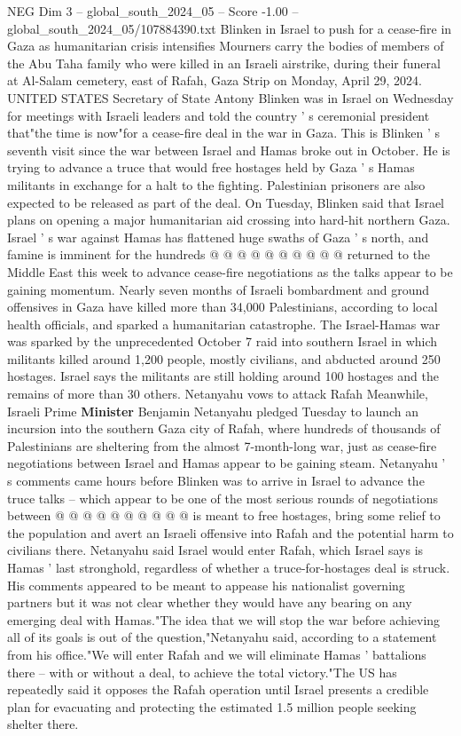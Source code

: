 \begin{textsample}{NEG Dim 3 – global\_south\_2024\_05 – Score -1.00 – global\_south\_2024\_05/107884390.txt}  \label{ex:f3_neg_364}
Blinken in Israel to push for a cease-fire in Gaza as humanitarian crisis intensifies Mourners carry the bodies of members of the Abu Taha family who were killed in an Israeli airstrike, during their funeral at Al-Salam cemetery, east of Rafah, Gaza Strip on Monday, April 29, 2024.
UNITED STATES Secretary of State Antony Blinken was in Israel on Wednesday for meetings with Israeli leaders and told the country ' s ceremonial president that"the time is now"for a cease-fire deal in the war in Gaza.
This is Blinken ' s seventh visit since the war between Israel and Hamas broke out in October.
He is trying to advance a truce that would free hostages held by Gaza ' s Hamas militants in exchange for a halt to the fighting.
Palestinian prisoners are also expected to be released as part of the deal.
On Tuesday, Blinken said that Israel plans on opening a major humanitarian aid crossing into hard-hit northern Gaza.
Israel ' s war against Hamas has flattened huge swaths of Gaza ' s north, and famine is imminent for the hundreds @ @ @ @ @ @ @ @ @ @ returned to the Middle East this week to advance cease-fire negotiations as the talks appear to be gaining momentum.
Nearly seven months of Israeli bombardment and ground offensives in Gaza have killed more than 34,000 Palestinians, according to local health officials, and sparked a humanitarian catastrophe.
The Israel-Hamas war was sparked by the unprecedented October 7 raid into southern Israel in which militants killed around 1,200 people, mostly civilians, and abducted around 250 hostages.
Israel says the militants are still holding around 100 hostages and the remains of more than 30 others.
Netanyahu vows to attack Rafah Meanwhile, Israeli Prime \textbf{Minister} Benjamin Netanyahu pledged Tuesday to launch an incursion into the southern Gaza city of Rafah, where hundreds of thousands of Palestinians are sheltering from the almost 7-month-long war, just as cease-fire negotiations between Israel and Hamas appear to be gaining steam.
Netanyahu ' s comments came hours before Blinken was to arrive in Israel to advance the truce talks -- which appear to be one of the most serious rounds of negotiations between @ @ @ @ @ @ @ @ @ @ is meant to free hostages, bring some relief to the population and avert an Israeli offensive into Rafah and the potential harm to civilians there.
Netanyahu said Israel would enter Rafah, which Israel says is Hamas ' last stronghold, regardless of whether a truce-for-hostages deal is struck.
His comments appeared to be meant to appease his nationalist governing partners but it was not clear whether they would have any bearing on any emerging deal with Hamas."The idea that we will stop the war before achieving all of its goals is out of the question,"Netanyahu said, according to a statement from his office."We will enter Rafah and we will eliminate Hamas ' battalions there -- with or without a deal, to achieve the total victory."The US has repeatedly said it opposes the Rafah operation until Israel presents a credible plan for evacuating and protecting the estimated 1.5 million people seeking shelter there.

\end{textsample}
